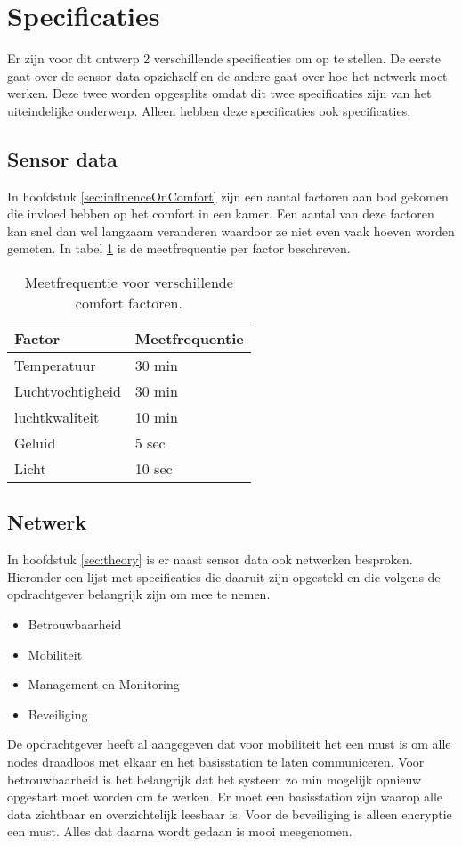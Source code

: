 \section{Specificaties}

Er zijn voor dit ontwerp 2 verschillende specificaties om op te stellen. De eerste gaat over de sensor data opzichzelf en de andere gaat over hoe 
het netwerk moet werken. Deze twee worden opgesplits omdat dit twee specificaties zijn van het uiteindelijke onderwerp. Alleen hebben deze specificaties 
ook specificaties.

\subsection{Sensor data}
In hoofdstuk \ref{sec:influenceOnComfort} zijn een aantal factoren aan bod gekomen die invloed hebben op het comfort in een kamer. Een aantal van deze factoren kan snel dan wel langzaam veranderen waardoor ze niet even vaak hoeven worden gemeten. In tabel \ref{tabel:meetfrequentie} is de meetfrequentie per factor beschreven.
\begin{table}[h]
    \centering
    \begin{tabular}{|l|l|}\hline
        Factor           & Meetfrequentie \\\hline
        Temperatuur      & 30 min         \\\hline
        Luchtvochtigheid & 30 min         \\\hline
        luchtkwaliteit   & 10 min         \\\hline
        Geluid           & 5 sec          \\\hline
        Licht            & 10 sec         \\\hline
    \end{tabular}
    \caption{Meetfrequentie voor verschillende comfort factoren.}
    \label{tabel:meetfrequentie}
\end{table}

\subsection{Netwerk}
In hoofdstuk \ref{sec:theory} is er naast sensor data ook netwerken besproken. Hieronder een lijst met specificaties die daaruit zijn 
opgesteld en die volgens de opdrachtgever belangrijk zijn om mee te nemen.
\begin{itemize}
    \item Betrouwbaarheid
    \item Mobiliteit
    \item Management en Monitoring
    \item Beveiliging
\end{itemize}

De opdrachtgever heeft al aangegeven dat voor mobiliteit het een must is om alle nodes draadloos met elkaar en het basisstation te laten communiceren.
Voor betrouwbaarheid is het belangrijk dat het systeem zo min mogelijk opnieuw opgestart moet worden om te werken.
Er moet een basisstation zijn waarop alle data zichtbaar en overzichtelijk leesbaar is. 
Voor de beveiliging is alleen encryptie een must. Alles dat daarna wordt gedaan is mooi meegenomen.